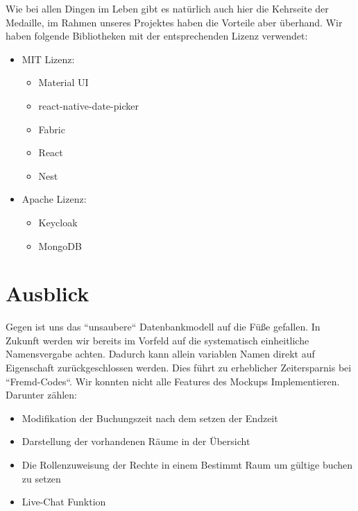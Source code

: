 Wie bei allen Dingen im Leben gibt es natürlich auch hier die Kehrseite der Medaille, im Rahmen unseres Projektes haben die Vorteile aber überhand. 
Wir haben folgende Bibliotheken mit der entsprechenden Lizenz verwendet:

\begin{itemize}
\item	MIT Lizenz:
\begin{itemize}
    \item	Material UI
    \item	react-native-date-picker
    \item	Fabric
    \item	React
    \item	Nest
\end{itemize}
\end{itemize}
\begin{itemize}
    \item	Apache Lizenz:
    \begin{itemize}
\item	Keycloak
\item	MongoDB
\end{itemize}
\end{itemize}


\section{Ausblick}
Gegen ist uns das “unsaubere“ Datenbankmodell auf die Füße gefallen. 
In Zukunft werden wir bereits im Vorfeld auf die systematisch einheitliche Namensvergabe achten. 
Dadurch kann allein variablen Namen direkt auf Eigenschaft zurückgeschlossen werden.
 Dies führt zu erheblicher Zeitersparnis bei “Fremd-Codes“. Wir konnten nicht alle Features des Mockups Implementieren. \\
 Darunter zählen:
\begin{itemize}
    \item	Modifikation der Buchungszeit nach dem setzen der Endzeit
    \item	Darstellung der vorhandenen Räume in der Übersicht
    \item	Die Rollenzuweisung der Rechte in einem Bestimmt Raum um gültige buchen zu setzen 
    \item	Live-Chat Funktion  
\end{itemize}
